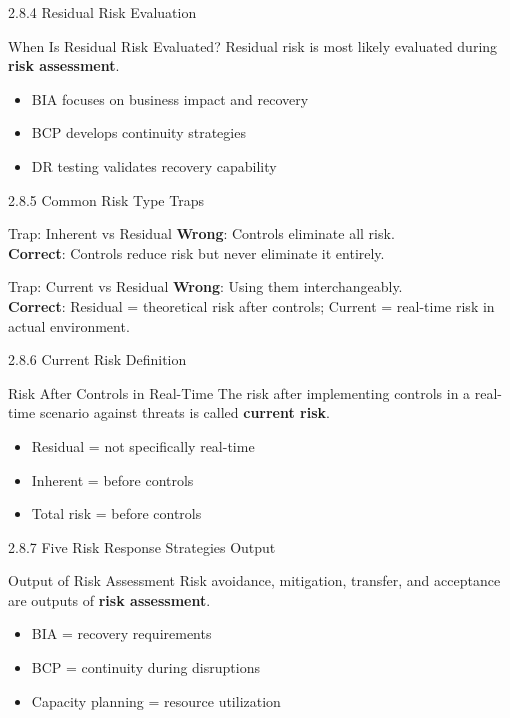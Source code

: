 \documentclass{beamer}
\begin{document}
	\begin{frame}{2.8.4 Residual Risk Evaluation}
		\begin{block}{When Is Residual Risk Evaluated?}
			Residual risk is most likely evaluated during \textbf{risk assessment}.
		\end{block}
		\begin{itemize}
			\item BIA focuses on business impact and recovery
			\item BCP develops continuity strategies
			\item DR testing validates recovery capability
		\end{itemize}
	\end{frame}
	
	\begin{frame}{2.8.5 Common Risk Type Traps}
		\begin{block}{Trap: Inherent vs Residual}
			\textbf{Wrong}: Controls eliminate all risk. \\
			\textbf{Correct}: Controls reduce risk but never eliminate it entirely.
		\end{block}
		\begin{block}{Trap: Current vs Residual}
			\textbf{Wrong}: Using them interchangeably. \\
			\textbf{Correct}: Residual = theoretical risk after controls; Current = real-time risk in actual environment.
		\end{block}
	\end{frame}
	
	\begin{frame}{2.8.6 Current Risk Definition}
		\begin{block}{Risk After Controls in Real-Time}
			The risk after implementing controls in a real-time scenario against threats is called \textbf{current risk}.
		\end{block}
		\begin{itemize}
			\item Residual = not specifically real-time
			\item Inherent = before controls
			\item Total risk = before controls
		\end{itemize}
	\end{frame}
	
	\begin{frame}{2.8.7 Five Risk Response Strategies Output}
		\begin{block}{Output of Risk Assessment}
			Risk avoidance, mitigation, transfer, and acceptance are outputs of \textbf{risk assessment}.
		\end{block}
		\begin{itemize}
			\item BIA = recovery requirements
			\item BCP = continuity during disruptions
			\item Capacity planning = resource utilization
		\end{itemize}
	\end{frame}
	
\end{document}
